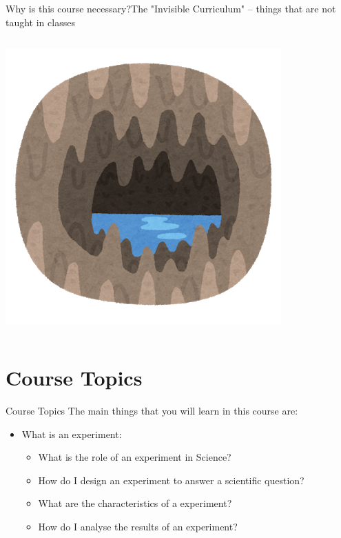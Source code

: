 \documentclass[aspectratio=169]{beamer}
\begin{document}
\begin{CJK}{UTF8}{ipxm}
\begin{frame}{Why is this course necessary?}{The "Invisible Curriculum" -- things that are not taught in classes}
\begin{columns}
    \includegraphics[width=1\textwidth]{../img/irasutoya_cave}
  \end{columns}
  \bigskip

\end{frame}

\section{Course Topics}
\begin{frame}{Course Topics}
  The main things that you will learn in this course are:\bigskip

  \begin{itemize}
    \item What is an experiment:
    \begin{itemize}
      \item What is the role of an experiment in Science?
      \item How do I design an experiment to answer a scientific question?
      \item What are the characteristics of a  experiment?
      \item How do I analyse the results of an experiment?
    \end{itemize}\bigskip


\end{itemize}
\end{frame}
\end{CJK}
\end{document}
